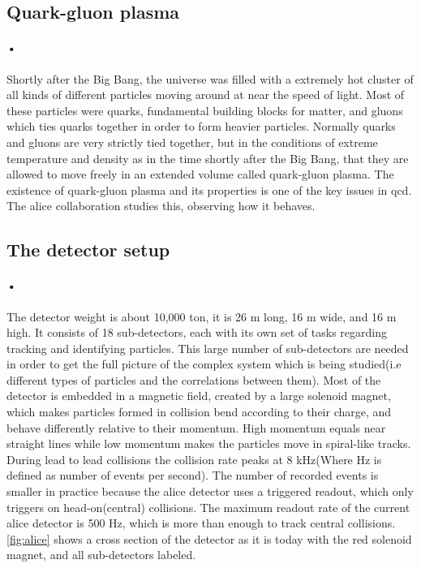 \documentclass[a4paper, 12pt]{report}
\begin{document}
\subsection{Quark-gluon plasma}
\paragraph{•}
Shortly after the Big Bang, the universe was filled with a extremely hot cluster of all kinds of different particles moving around at near the speed of light\cite{alice-physics}.
Most of these particles were quarks, fundamental building blocks for matter, and gluons which ties quarks together in order to form heavier particles.
Normally quarks and gluons are very strictly tied together, but in the conditions of extreme temperature and density as in the time shortly after the Big Bang, that they are allowed to move freely in an extended volume called quark-gluon plasma.
The existence of quark-gluon plasma and its properties is one of the key issues in \gls{qcd}.
The \gls{alice} collaboration studies this, observing how it behaves.

\subsection{The detector setup}
\paragraph{•}
The detector weight is about 10,000 ton, it is 26 m long, 16 m wide, and 16 m high\cite{alice-about}.
It consists of 18 sub-detectors, each with its own set of tasks regarding tracking and identifying particles.
This large number of sub-detectors are needed in order to get the full picture of the complex system which is being studied(i.e different types of particles and the correlations between them).
Most of the detector is embedded in a magnetic field, created by a large solenoid magnet, which makes particles formed in collision bend according to their charge, and behave differently relative to their momentum. High momentum equals near straight lines while low momentum makes the particles move in spiral-like tracks.
During lead to lead collisions the collision rate peaks at 8 kHz(Where Hz is defined as number of events per second).
The number of recorded events is smaller in practice because the \gls{alice} detector uses a triggered readout, which only triggers on head-on(central) collisions.
The maximum readout rate of the current \gls{alice} detector is 500 Hz, which is more than enough to track central collisions.
\ref{fig:alice} shows a cross section of the detector as it is today with the red solenoid magnet, and all sub-detectors labeled.
\end{document}
